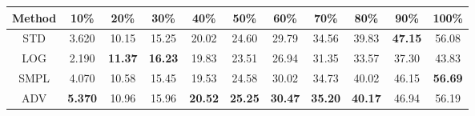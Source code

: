 \documentclass{standalone}
\begin{document}
\begin{tabular}{c|cccccccccc}
      \toprule
      Method & 10\% & 20\% & 30\% & 40\% & 50\% & 60\% & 70\% & 80\% & 90\% & 100\% \\
      \midrule
STD & 3.620 & 10.15 & 15.25 & 20.02 & 24.60 & 29.79 & 34.56 & 39.83 & \textbf{47.15} & 56.08\\
LOG & 2.190 & \textbf{11.37} & \textbf{16.23} & 19.83 & 23.51 & 26.94 & 31.35 & 33.57 & 37.30 & 43.83\\
SMPL & 4.070 & 10.58 & 15.45 & 19.53 & 24.58 & 30.02 & 34.73 & 40.02 & 46.15 & \textbf{56.69}\\
ADV & \textbf{5.370} & 10.96 & 15.96 & \textbf{20.52} & \textbf{25.25} & \textbf{30.47} & \textbf{35.20} & \textbf{40.17} & 46.94 & 56.19\\
  \bottomrule
\end{tabular}
\end{document}

